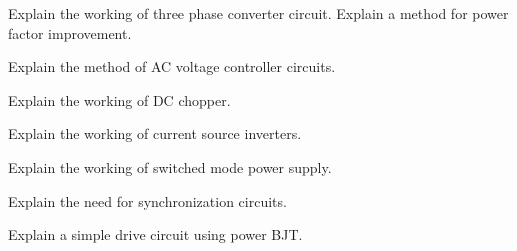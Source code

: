 \item \iitem Explain the working of three phase converter circuit. Explain a method for
  power factor improvement.
\Or
\item Explain the method of AC voltage controller circuits.
\ene

\item \iitem Explain the working of DC chopper.
\Or
\item Explain the working of current source inverters.
\ene

\item \iitem Explain the working of switched mode power supply.
\Or
\item \iitem Explain the need for synchronization circuits.
\item Explain a simple drive circuit using power BJT.
\ene
\ene

\markC
\ene
